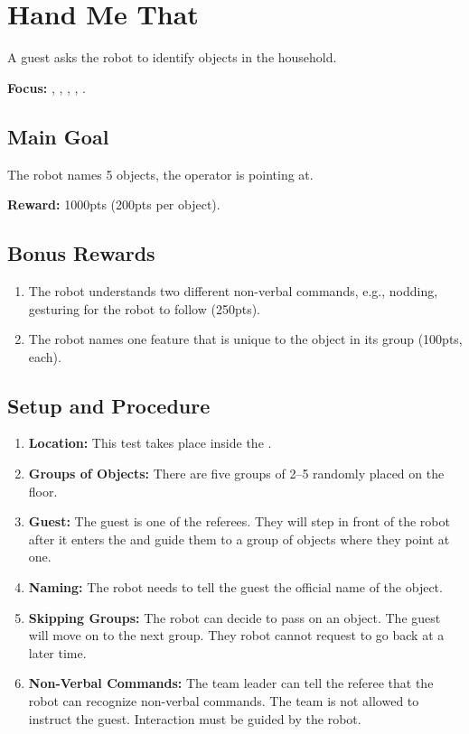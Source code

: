\section{Hand Me That}
\label{test:hand-me-that}
A guest asks the robot to identify objects in the household.

\noindent \textbf{Focus:} \SysI{}, \HRI{}, \GestRec{}, \CV{}, \OR{}.


\subsection*{Main Goal}
The robot names 5 objects, the operator is pointing at.

\noindent\textbf{Reward:} 1000pts (200pts per object).


\subsection*{Bonus Rewards}
\begin{enumerate}[nosep]
	\item The robot understands two different non-verbal commands, e.g., nodding, gesturing for the robot to follow (250pts).
	\item The robot names one feature that is unique to the object in its group (100pts, each).
\end{enumerate}


\subsection*{Setup and Procedure}
\begin{enumerate}[nosep]
	\item \textbf{Location:} This test takes place inside the \Arena{}.

	\item \textbf{Groups of Objects:} There are five groups of 2--5 \KnownObjects{} randomly placed on the floor.
	
	\item \textbf{Guest:} The guest is one of the referees. They will step in front of the robot after it enters the \Arena{} and guide them to a group of objects where they point at one.

	\item \textbf{Naming:} The robot needs to tell the guest the official name of the object.

	\item \textbf{Skipping Groups:} The robot can decide to pass on an object. The guest will move on to the next group. They robot cannot request to go back at a later time.
	
	\item \textbf{Non-Verbal Commands:} The team leader can tell the referee that the robot can recognize non-verbal commands. The team is not allowed to instruct the guest. Interaction must be guided by the robot.
\end{enumerate}


